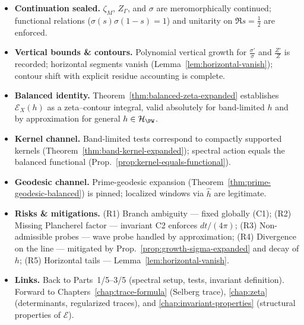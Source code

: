 \begin{tcolorbox}[colback=gray!3,colframe=gray!50,
  title=ZNB-9+++ Audit Outcome — Part 4/5 (sealed • Maximally Expanded)]
\begin{itemize}
  \item \textbf{Continuation sealed.} $\zeta_M$, $Z_\Gamma$, and $\sigma$ are meromorphically continued; functional relations ($\sigma(s)\sigma(1-s)=1$) and unitarity on $\Re s=\tfrac12$ are enforced.
  \item \textbf{Vertical bounds \& contours.} Polynomial vertical growth for $\frac{\sigma'}{\sigma}$ and $\frac{Z'}{Z}$ is recorded; horizontal segments vanish (Lemma~\ref{lem:horizontal-vanish}); contour shift with explicit residue accounting is complete.
  \item \textbf{Balanced identity.} Theorem~\ref{thm:balanced-zeta-expanded} establishes $\mathcal E_X(h)$ as a zeta–contour integral, valid absolutely for band-limited $h$ and by approximation for general $h\in\mathcal H_{\PW}$.
  \item \textbf{Kernel channel.} Band-limited tests correspond to compactly supported kernels (Theorem~\ref{thm:band-kernel-expanded}); spectral action equals the balanced functional (Prop.~\ref{prop:kernel-equals-functional}).
  \item \textbf{Geodesic channel.} Prime-geodesic expansion (Theorem~\ref{thm:prime-geodesic-balanced}) is pinned; localized windows via $\hat h$ are legitimate.
  \item \textbf{Risks \& mitigations.} (R1) Branch ambiguity — fixed globally (C1); (R2) Missing Plancherel factor — invariant C2 enforces $dt/(4\pi)$; (R3) Non-admissible probes — wave probe handled by approximation; (R4) Divergence on the line — mitigated by Prop.~\ref{prop:growth-sigma-expanded} and decay of $h$; (R5) Horizontal tails — Lemma~\ref{lem:horizontal-vanish}.
  \item \textbf{Links.} Back to Parts~1/5–3/5 (spectral setup, tests, invariant definition). Forward to Chapters~\ref{chap:trace-formula} (Selberg trace), \ref{chap:zeta} (determinants, regularized traces), and \ref{chap:invariant-properties} (structural properties of $\mathcal E$).
\end{itemize}
\end{tcolorbox}


